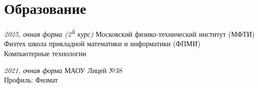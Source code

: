 \section*{Образование}

\aside
{\textit{2025, очная форма (2\textsuperscript{\,й} курс)}}
{Московский физико-технический институт (МФТИ)\\Физтех школа прикладной математики и информатики (ФПМИ)\\Компьютерные технологии}

\aside
{\textit{2021, очная форма}}
{МАОУ Лицей №38\\Профиль: Физмат}